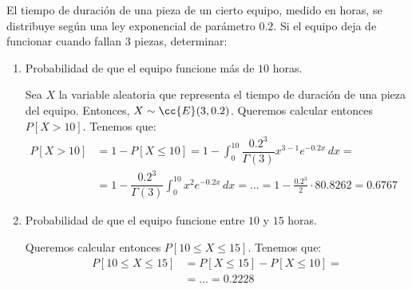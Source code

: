 \begin{ejercicio}
    El tiempo de duración de una pieza de un cierto equipo, medido en horas, se distribuye según una ley exponencial de parámetro $0.2$. 
    Si el equipo deja de funcionar cuando fallan $3$ piezas, determinar:
    \begin{enumerate}
        \item Probabilidad de que el equipo funcione más de $10$ horas.
        
        Sea $X$ la variable aleatoria que representa el tiempo de duración de una pieza del equipo. Entonces, $X\sim \cc{E}(3,0.2)$.
        Queremos calcular entonces $P[X>10]$. Tenemos que:
        \begin{align*}
            P[X>10] &= 1-P[X\leq 10] = 1-\int_{0}^{10} \dfrac{0.2^3}{\Gamma(3)} x^{3-1} e^{-0.2x} \, dx =&\\&= 1-\dfrac{0.2^3}{\Gamma(3)} \int_{0}^{10}x^2 e^{-0.2x} \, dx
            = ... = 1-\frac{0.2^3}{2}\cdot 80.8262 = 0.6767
        \end{align*}
        \item Probabilidad de que el equipo funcione entre $10$ y $15$ horas.
        
        Queremos calcular entonces $P[10\leq X\leq 15]$. Tenemos que:
        \begin{align*}
            P[10\leq X\leq 15] &= P[X\leq 15] - P[X\leq 10] =\\&= ... = 0.2228
        \end{align*}
    \end{enumerate}
\end{ejercicio}

